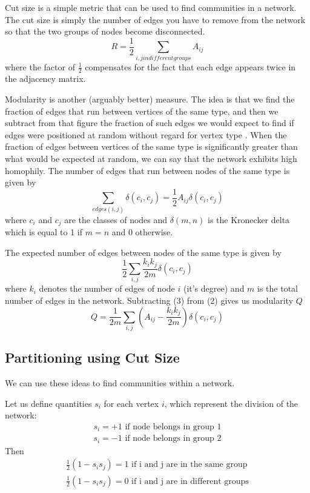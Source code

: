 \documentclass[12pt]{article}
\begin{document}
	
	Cut size is a simple metric that can be used to find communities in a network. The cut size is simply the number of edges you have to remove from the network so that the two groups of nodes become disconnected. 
	\begin{equation}
		R = \frac{1}{2} \sum_{i,j in different groups} A_{ij}
	\end{equation}
	where the factor of $\frac{1}{2}$ compensates for the fact that each edge appears twice in the adjacency matrix.

	Modularity is another (arguably better) measure. The idea is that we find  the fraction of edges that run between vertices of the same type, and then we subtract from that figure the fraction of such edges we would expect to find if edges were positioned at random without regard for vertex type \cite{networkBook}. When the fraction of edges between vertices of the same type is significantly greater than what would be expected at random, we can say that the network exhibits high homophily. The number of edges that run between nodes of the same type is given by
	\begin{equation}
		\sum_{edges (i,j)} \delta (c_i, c_j) = \frac{1}{2} A_{ij} \delta (c_i, c_j)
	\end{equation}
	where $c_i$ and $c_j$ are the classes of nodes and $\delta (m,n)$ is the Kronecker delta which is equal to 1 if $m = n$ and 0 otherwise.
	
	
	The expected number of edges between nodes of the same type is given by
	\begin{equation}
		\frac{1}{2} \sum_{i,j} \frac{k_i k_j}{2m} \delta (c_i,c_j)
	\end{equation}
	where $k_i$ denotes the number of edges of node $i$ (it's degree) and $m$ is the total number of edges in the network. Subtracting (3) from (2) gives us modularity $Q$
	\begin{equation}
		Q = \frac{1}{2m} \sum_{i,j} \left( A_{ij} - \frac{k_i k_j}{2m} \right) \delta (c_i,c_j)
	\end{equation}

	\subsection{Partitioning using Cut Size} 
	We can use these ideas to find communities within a network.  
	
	Let us define quantities $s_i$ for each vertex $i$, which represent the division of the network: 
	\begin{align}
		s_i = +1 \text{ if node belongs in group 1} \\
		s_i = -1 \text{ if node belongs in group 2}
	\end{align}
	Then
	\begin{align}
		\frac{1}{2} (1 - s_i s_j) = 1 \text{ if i and j are in the same group} \\
		\frac{1}{2} (1 - s_i s_j) = 0 \text{ if i and j are in different groups}
	\end{align}
	
\end{document}
